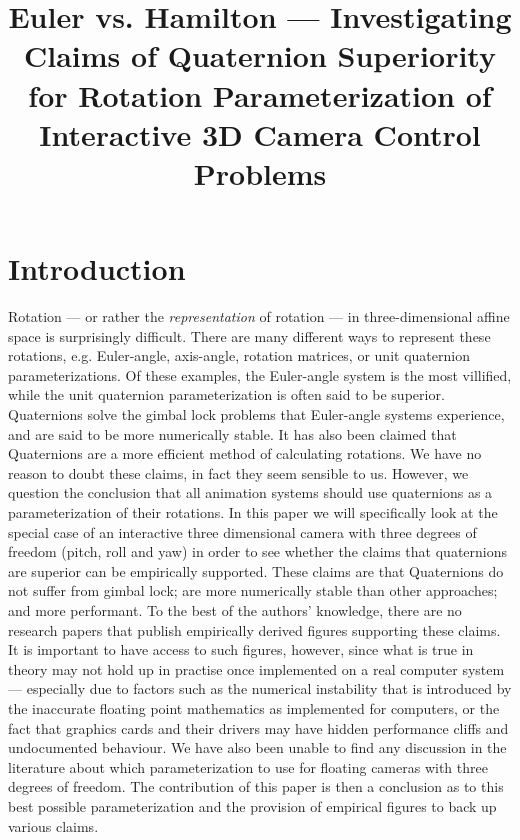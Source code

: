 \documentclass[a4paper]{article}
\title{Euler vs. Hamilton --- Investigating Claims of Quaternion Superiority for Rotation Parameterization of Interactive 3D Camera Control Problems}
\author{}
\date{}
\begin{document}
\maketitle

\section{Introduction}

Rotation --- or rather the \emph{representation} of rotation --- in three-dimensional affine space is surprisingly difficult.
There are many different ways to represent these rotations, e.g. Euler-angle, axis-angle, rotation matrices, or unit quaternion parameterizations.
Of these examples, the Euler-angle system is the most villified, while the unit quaternion parameterization is often said to be superior.
Quaternions solve the gimbal lock problems that Euler-angle systems experience, and are said to be more numerically stable.
It has also been claimed that Quaternions are a more efficient method of calculating rotations.
We have no reason to doubt these claims, in fact they seem sensible to us.
However, we question the conclusion that all animation systems should use quaternions as a parameterization of their rotations.
In this paper we will specifically look at the special case of an interactive three dimensional camera with three degrees of freedom (pitch, roll and yaw) in order to see whether the claims that quaternions are superior can be empirically supported.
These claims are that Quaternions do not suffer from gimbal lock; are more numerically stable than other approaches; and more performant.
To the best of the authors' knowledge, there are no research papers that publish empirically derived figures supporting these claims.
It is important to have access to such figures, however, since what is true in theory may not hold up in practise once implemented on a real computer system ---
especially due to factors such as the numerical instability that is introduced by the inaccurate floating point mathematics as implemented for computers, or the fact that graphics cards and their drivers may have hidden performance cliffs and undocumented behaviour.
We have also been unable to find any discussion in the literature about which parameterization to use for floating cameras with three degrees of freedom.
The contribution of this paper is then a conclusion as to this best possible parameterization and the provision of empirical figures to back up various claims.
\end{document}
